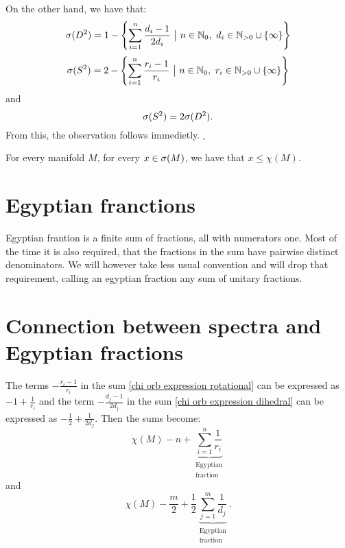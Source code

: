 On the other hand, we have that:
\begin{equation}
\speD = 1-\left\{\sum\limits_{i=1}^n\frac{d_i-1}{2d_i}\ 
\big|\ n\in\mathbb{N}_0,\ d_i\in\mathbb{N}_{>0}\cup \{\infty\}\right\}
\end{equation}
\begin{equation}
\speS = 2 - \left\{\sum\limits_{i=1}^n \frac{r_i-1}{r_i}\ \big|\ n\in\mathbb{N}_0,\ 
r_i\in\mathbb{N}_{>0}\cup \{\infty\}\right\}
\end{equation}
and
\begin{equation}
{{\sigma}(S^2)} = 2{{\sigma}(D^2)}.
\end{equation}
From this, the observation follows immedietly. $_\square$

\begin{observation}
For every manifold $M$, for every $x \in {{\sigma}(M)}$, we have that $x \leq \chi(M)$.
\end{observation}


\section{Egyptian franctions}
Egyptian frantion is a finite sum of fractions, all with numerators one. 
Most of the time it is also required, that the fractions in the sum have pairwise distinct 
denominators. We will however take less usual convention and will drop that requirement, 
calling an egyptian fraction any sum of unitary fractions. 
\section{Connection between spectra and Egyptian fractions}\label{Egyptian_fractions}
The terms $-\frac{r_i-1}{r_i}$ in the sum \ref{chi orb expression rotational} 
can be expressed as $-1+ \frac{1}{r_i}$ 
and the term $-\frac{d_j-1}{2d_j}$ in the sum \ref{chi orb expression dihedral} can be expressed as 
$-\frac{1}{2} + \frac{1}{2d_j}$. 
Then the sums become:
\begin{equation}\label{Egyptian S2 sum}
\chi(M) - n + \underbrace{\sum_{i=1}^n \frac{1}{r_i}}_{
\substack{\textrm{Egyptian} \\ \textrm{fraction}}}
\end{equation}
and
\begin{equation}\label{Egyptian D2 sum}
\chi(M) - \frac{m}{2} + \frac{1}{2}
\underbrace{\sum_{j=1}^m \frac{1}{d_j}}_{
\substack{\textrm{Egyptian} \\\textrm{fraction}}}.
\end{equation}

